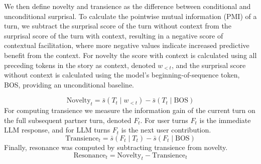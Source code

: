 \documentclass[11pt]{article}
\begin{document}
We then define novelty and transience as the difference between conditional and unconditional surprisal. To calculate the pointwise mutual information (PMI) of a turn, we subtract the surprisal score of the turn without context from the surprisal score of the turn with context, resulting in a negative score of contextual facilitation, where more negative values indicate increased predictive benefit from the context. For novelty the score with context is calculated using all preceding tokens in the story as context, denoted $w_{<t}$, and the surprisal score without context is calculated using the model's beginning-of-sequence token, BOS, providing an unconditional baseline.

\begin{equation}
\mathrm{Novelty}_t = \bar{s}(T_t \mid w_{<t}) - \bar{s}(T_t \mid \text{BOS})
\end{equation}
For computing transience we measure the information gain of the current turn on the full subsequent partner turn, denoted $F_t$. For user turns $F_t$ is the immediate LLM response, and for LLM turns $F_t$ is the next user contribution.
\begin{equation}
\mathrm{Transience}_t = \bar{s}(F_t \mid T_t) - \bar{s}(F_t \mid \text{BOS})
\end{equation}
Finally, resonance was computed by subtracting transience from novelty.
\begin{equation}
\mathrm{Resonance}_t = \mathrm{Novelty}_t - \mathrm{Transience}_t
\end{equation}
\end{document}
